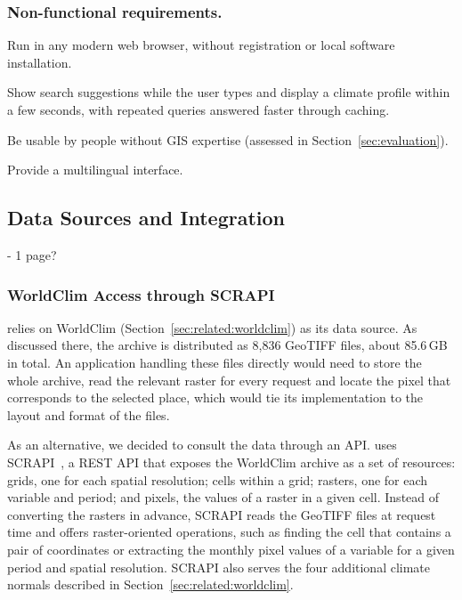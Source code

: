 \subsubsection{Non-functional requirements.}
\begin{description}
  \setlength{\itemsep}{3pt}
  \item[NFR1 --- Portability.] Run in any modern web browser, without registration or
    local software installation.
  \item[NFR2 --- Response time.] Show search suggestions while the user types and
    display a climate profile within a few seconds, with repeated queries answered
    faster through caching. %
  \item[NFR3 --- Usability.] Be usable by people without GIS expertise
    (assessed in Section~\ref{sec:evaluation}).
  \item[NFR4 --- Localisation.] Provide a multilingual interface.
\end{description}

\subsection{Data Sources and Integration}\label{sec:web-application:data}
- 1 page?
\subsubsection{WorldClim Access through SCRAPI}\label{sec:web-application:data:scrapi-worldclim}
\webappname{} relies on WorldClim (Section~\ref{sec:related:worldclim}) as its data
source. As discussed there, the archive is distributed as 8{,}836 GeoTIFF files, about
85.6\,GB in total. An application handling these files directly would need to store the
whole archive, read the relevant raster for every request and locate the pixel that
corresponds to the selected place, which would tie its implementation to the layout
and format of the files.

As an alternative, we decided to consult the data through an API. \webappname{} uses
SCRAPI~\cite{scrapi}, a REST API that exposes the WorldClim archive as a set of
resources: grids, one for each spatial resolution; cells within a grid; rasters, one for
each variable and period; and pixels, the values of a raster in a given cell. Instead of
converting the rasters in advance, SCRAPI reads the GeoTIFF files at request time and
offers raster-oriented operations, such as finding the cell that contains a pair of
coordinates or extracting the monthly pixel values of a variable for a given period and
spatial resolution. SCRAPI also serves the four additional climate normals described in
Section~\ref{sec:related:worldclim}.

